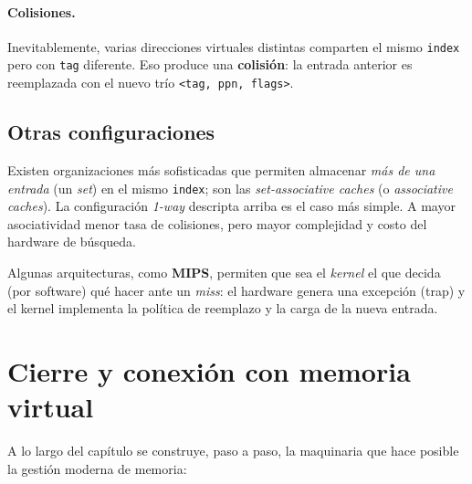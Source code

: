 \documentclass[11pt,a4paper]{article}
\begin{document}
\paragraph{Colisiones.}
Inevitablemente, varias direcciones virtuales distintas comparten el
mismo \texttt{index} pero con \texttt{tag} diferente. Eso produce una
\textbf{colisión}: la entrada anterior es reemplazada con el nuevo
trío \texttt{<tag, ppn, flags>}.

\subsection{Otras configuraciones}

Existen organizaciones más sofisticadas que permiten almacenar
\emph{más de una entrada} (un \emph{set}) en el mismo \texttt{index};
son las \emph{set-associative caches} (o \emph{associative caches}). La
configuración \emph{1-way} descripta arriba es el caso más simple. A
mayor asociatividad menor tasa de colisiones, pero mayor complejidad y
costo del hardware de búsqueda.

Algunas arquitecturas, como \textbf{MIPS}, permiten que sea el
\emph{kernel} el que decida (por software) qué hacer ante un
\emph{miss}: el hardware genera una excepción (trap) y el kernel
implementa la política de reemplazo y la carga de la nueva entrada.

\section{Cierre y conexión con memoria virtual}

A lo largo del capítulo se construye, paso a paso, la maquinaria que
hace posible la gestión moderna de memoria:
\end{document}
